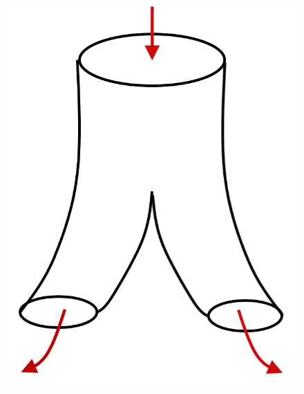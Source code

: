 \documentclass[a4paper,11pt,notitlepage]{report}
\theoremstyle{definition}
\begin{document}
\begin{figure}[h]
\begin{minipage}[b]{4cm}{\includegraphics[scale=0.4]{images/Stringtheorie.png}}\end{minipage}
\end{figure}
\end{document}
